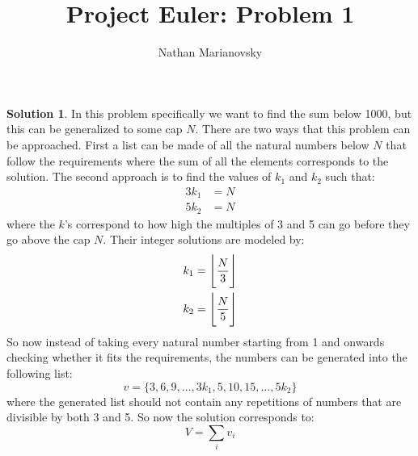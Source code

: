 \documentclass[12pt, letterpaper, onecolumn, conference, final]{IEEEtran}
\title{Project Euler: Problem 1}
\author{Nathan Marianovsky}
\DeclarePairedDelimiter\floor{\Bigg\lfloor}{\Bigg\rfloor}
\theoremstyle{definition}
\newtheorem*{problem*}{Problem}
\newtheorem*{solution*}{Solution}
\theoremstyle{plain}
\begin{document}
\maketitle

\begin{center}
\end{center}

\vspace{.3cm}
\begin{solution*}
In this problem specifically we want to find the sum below 1000, but this can be generalized to some cap $N$. There are two ways that this problem can be approached. First a list can be made of all the natural numbers below $N$ that follow the requirements where the sum of all the elements corresponds to the solution. The second approach is to find the values of $k_1$ and $k_2$ such that:
\begin{equation*}
\begin{split}
3k_1 &= N \\
5k_2 &= N
\end{split}
\end{equation*}
where the $k$'s correspond to how high the multiples of 3 and 5 can go before they go above the cap $N$. Their integer solutions are modeled by:
\begin{equation*}
\begin{split}
k_1 &= \floor{\frac{N}{3}} \\
k_2 &= \floor{\frac{N}{5}}
\end{split}
\end{equation*}
So now instead of taking every natural number starting from 1 and onwards checking whether it fits the requirements, the numbers can be generated into the following list:
\begin{equation*}
v = \Big\{3, 6, 9, \dots, 3k_1, 5, 10, 15, \dots, 5k_2\Big\}
\end{equation*}
where the generated list should not contain any repetitions of numbers that are divisible by both 3 and 5. So now the solution corresponds to:
\begin{equation*}
V = \sum_{i} v_i
\end{equation*}
\end{solution*}
\end{document}
